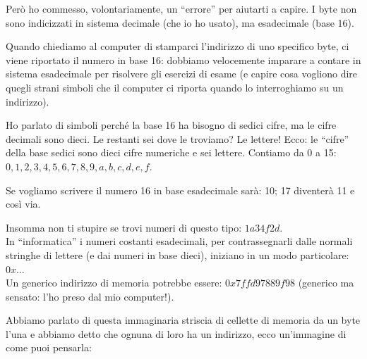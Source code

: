 	Però ho commesso, volontariamente, un ``errore'' per aiutarti a capire. I byte non sono indicizzati in sistema decimale (che io ho usato), ma esadecimale (base 16). 
	
	Quando chiediamo al computer di stamparci l'indirizzo di uno specifico byte, ci viene riportato il numero in base 16: dobbiamo velocemente imparare a contare in sistema esadecimale per risolvere gli esercizi di esame (e capire cosa vogliono dire quegli strani simboli che il computer ci riporta quando lo interroghiamo su un indirizzo).
	
	Ho parlato di simboli perché la base 16 ha bisogno di sedici cifre, ma le cifre decimali sono dieci. Le restanti sei dove le troviamo? Le lettere! Ecco: le ``cifre'' della base sedici sono dieci cifre numeriche e sei lettere. Contiamo da 0 a 15: $0, 1, 2, 3, 4, 5, 6, 7, 8, 9, a, b, c, d, e ,f$.
	
	Se vogliamo scrivere il numero 16 in base esadecimale sarà: 10; 17 diventerà 11 e così via. 
	
	Insomma non ti stupire se trovi numeri di questo tipo: $1a34f2d$. \\
	
	In ``informatica'' i numeri costanti esadecimali,  per contrassegnarli dalle normali stringhe di lettere (e dai numeri in base dieci), iniziano in un modo particolare: $0x\ldots$\\
	Un generico indirizzo di memoria potrebbe essere: $0x7ffd97889f98$ (generico ma sensato: l'ho preso dal mio computer!).

	Abbiamo parlato di questa immaginaria striscia di cellette di memoria da un byte l'una e abbiamo detto che ognuna di loro ha un indirizzo, ecco un'immagine di come puoi pensarla:
	
